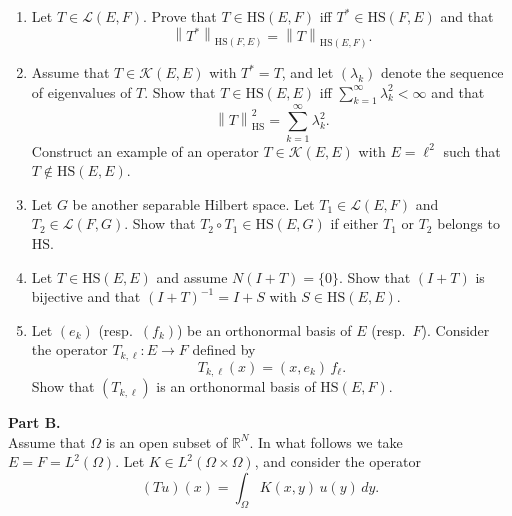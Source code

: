 \documentclass[12pt]{article}
\newcommand{\norm}[1]{\left\|#1\right\|}
\newcommand{\R}{\mathbb{R}}
\begin{document}
\begin{enumerate}
\item Let $T \in \mathcal{L}(E,F)$. Prove that $T \in \mathrm{HS}(E,F)$ iff $T^* \in \mathrm{HS}(F,E)$ and that
\[
\norm{T^*}_{\mathrm{HS}(F,E)} = \norm{T}_{\mathrm{HS}(E,F)}.
\]
 
\item Assume that $T \in \mathcal{K}(E,E)$ with $T^* = T$, and let $(\lambda_k)$ denote the sequence of
eigenvalues of $T$. Show that $T \in \mathrm{HS}(E,E)$ iff $\sum_{k=1}^\infty \lambda_k^2 < \infty$ and that
\[
\norm{T}_{\mathrm{HS}}^2 = \sum_{k=1}^\infty \lambda_k^2.
\]
Construct an example of an operator $T \in \mathcal{K}(E,E)$ with $E = \ell^2$ such that
$T \notin \mathrm{HS}(E,E)$.
 
\item Let $G$ be another separable Hilbert space. Let $T_1 \in \mathcal{L}(E,F)$ and
$T_2 \in \mathcal{L}(F,G)$. Show that $T_2 \circ T_1 \in \mathrm{HS}(E,G)$ if either $T_1$ or $T_2$ belongs to $\mathrm{HS}$.
 
\item Let $T \in \mathrm{HS}(E,E)$ and assume $N(I+T) = \{0\}$. Show that $(I+T)$ is bijective
and that $(I+T)^{-1} = I + S$ with $S \in \mathrm{HS}(E,E)$.
 
\item Let $(e_k)$ (resp.\ $(f_k)$) be an orthonormal basis of $E$ (resp.\ $F$). Consider the
operator $T_{k,\ell} : E \to F$ defined by
\[
T_{k,\ell}(x) = (x, e_k)\, f_\ell.
\]
Show that $(T_{k,\ell})$ is an orthonormal basis of $\mathrm{HS}(E,F)$.
\end{enumerate}
 
\noindent\textbf{Part B.}\\
Assume that $\Omega$ is an open subset of $\R^N$. In what follows we take $E = F = L^2(\Omega)$.
Let $K \in L^2(\Omega \times \Omega)$, and consider the operator
\begin{equation}\tag{1}
(Tu)(x) = \int_\Omega K(x,y)\,u(y)\,dy.
\end{equation}
 
\end{document}

